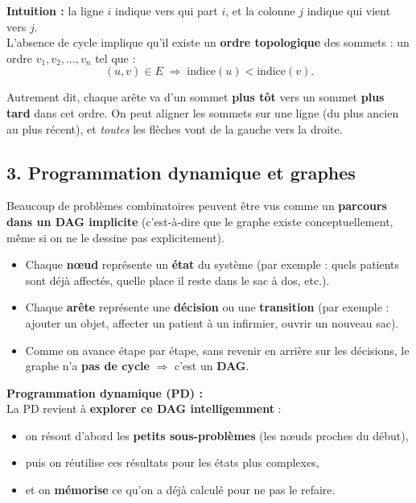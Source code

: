 \textbf{Intuition :} la ligne $i$ indique \og vers qui part $i$\fg{}, et la colonne $j$ indique \og qui vient vers $j$\fg{}. \\

L'absence de cycle implique qu'il existe un \textbf{ordre topologique} des sommets :  
un ordre $v_1, v_2, \dots, v_n$ tel que :
\[
(u,v) \in E \;\Rightarrow\; \text{indice}(u) < \text{indice}(v).
\]

Autrement dit, chaque arête va d'un sommet \textbf{plus tôt} vers un sommet \textbf{plus tard} dans cet ordre. On peut aligner les sommets sur une ligne (du plus \og ancien\fg{} au plus \og récent\fg{}), et \emph{toutes} les flèches vont de la gauche vers la droite.

\subsection*{3. Programmation dynamique et graphes}

Beaucoup de problèmes combinatoires peuvent être vus comme un \textbf{parcours dans un DAG implicite} (c'est-à-dire que le graphe existe conceptuellement, même si on ne le dessine pas explicitement). 

\begin{itemize}
    \item Chaque \textbf{nœud} représente un \textbf{état} du système (par exemple : quels patients sont déjà affectés, quelle place il reste dans le sac à dos, etc.).
    \item Chaque \textbf{arête} représente une \textbf{décision} ou une \textbf{transition} (par exemple : ajouter un objet, affecter un patient à un infirmier, ouvrir un nouveau sac).
    \item Comme on avance étape par étape, sans revenir en arrière sur les décisions, le graphe n’a \textbf{pas de cycle} $\Rightarrow$ c’est un \textbf{DAG}. \\
\end{itemize}

\textbf{Programmation dynamique (PD) :} \\
La PD revient à \textbf{explorer ce DAG intelligemment} :
\begin{itemize}
    \item on résout d'abord les \textbf{petits sous-problèmes} (les nœuds \og proches du début\fg{}),
    \item puis on réutilise ces résultats pour les états plus complexes,
    \item et on \textbf{mémorise} ce qu’on a déjà calculé pour ne pas le refaire. \\
\end{itemize}

